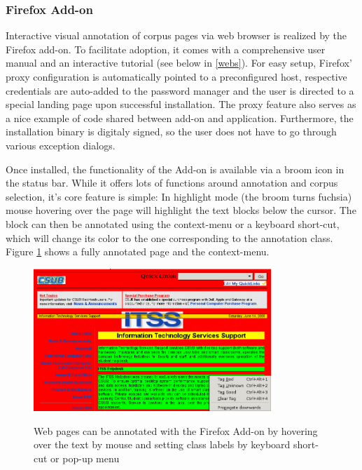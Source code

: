 \subsubsection{Firefox Add-on}

Interactive visual annotation of corpus pages via web browser is realized by the {\KrdWrd} Firefox add-on.
To facilitate adoption, it comes with a comprehensive user manual and an interactive tutorial (see below in \ref{webs}).
For easy setup, Firefox' proxy configuration is automatically pointed to a preconfigured host, respective credentials are auto-added to the password manager and the user is directed to a special landing page upon successful installation.
The proxy feature also serves as a nice example of code shared between add-on and application.
Furthermore, the installation binary is digitaly signed, so the user does not have to go through various exception dialogs.


Once installed, the functionality of the Add-on is available via a broom icon in the status bar.
While it offers lots of functions around annotation and corpus selection, it's core feature is simple:
In highlight mode (the broom turns fuchsia) mouse hovering over the page will highlight the text blocks below the cursor.
The block can then be annotated using the context-menu or a keyboard short-cut, which will change its color to the one corresponding to the annotation class.
Figure \ref{f:tut0} shows a fully annotated page and the context-menu.

\begin{figure}
	{\includegraphics[width=0.8\textwidth]{tut0}}
\caption{\label{f:tut0}Web pages can be annotated with the {\KrdWrd} Firefox Add-on by hovering over the text by mouse and setting class labels by keyboard short-cut or pop-up menu}
\end{figure}


